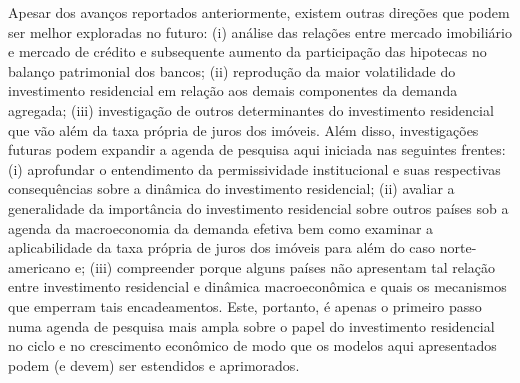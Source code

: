 
Apesar dos avanços reportados anteriormente, existem outras direções que podem ser melhor exploradas no futuro: (i) análise das relações entre mercado imobiliário e mercado de crédito e subsequente aumento da participação das hipotecas no balanço patrimonial dos bancos; (ii) reprodução da maior volatilidade do investimento residencial em relação aos demais componentes da demanda agregada; (iii) investigação de outros determinantes do investimento residencial que vão além da taxa própria de juros dos imóveis.
Além disso, investigações futuras podem expandir a agenda de pesquisa aqui iniciada nas seguintes frentes:
	(i) aprofundar o entendimento da permissividade institucional e suas respectivas consequências sobre a dinâmica do investimento residencial; 
	(ii) avaliar a generalidade da importância do investimento residencial sobre outros países sob a agenda da macroeconomia da demanda efetiva bem como examinar a aplicabilidade da taxa própria de juros dos imóveis para além do caso norte-americano e;
	(iii) compreender porque alguns países não apresentam tal relação entre investimento residencial e dinâmica macroeconômica e quais os mecanismos que emperram tais encadeamentos.
Este, portanto, é apenas o primeiro passo numa agenda de pesquisa mais ampla sobre o papel do investimento residencial no ciclo e no crescimento econômico de modo que os modelos aqui apresentados podem (e devem) ser estendidos e aprimorados.